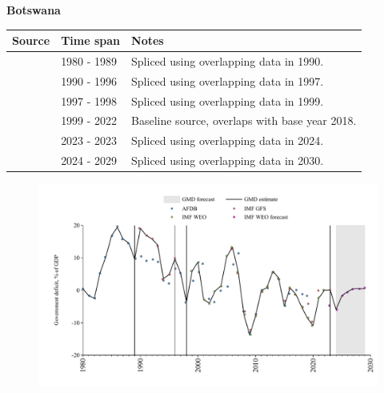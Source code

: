 \documentclass[12pt,a4paper,landscape]{article}
\begin{document}
\begin{adjustbox}{max totalsize={\paperwidth}{\paperheight},center}
\begin{minipage}[t][\textheight][t]{\textwidth}
\vspace*{0.5cm}
{}
\begin{center}
{\Large\bfseries Botswana}
\end{center}
\vspace{0.5cm}
\begin{table}[H]
\centering
\small
\begin{tabular}{|l|l|l|}
\hline
\textbf{Source} & \textbf{Time span} & \textbf{Notes} \\
\hline
\rowcolor{white}\cite{AFDB}& 1980 - 1989 &Spliced using overlapping data in 1990.\\
\rowcolor{lightgray}\cite{IMF_GFS}& 1990 - 1996 &Spliced using overlapping data in 1997.\\
\rowcolor{white}\cite{AFDB}& 1997 - 1998 &Spliced using overlapping data in 1999.\\
\rowcolor{lightgray}\cite{IMF_WEO}& 1999 - 2022 &Baseline source, overlaps with base year 2018.\\
\rowcolor{white}\cite{IMF_GFS}& 2023 - 2023 &Spliced using overlapping data in 2024.\\
\rowcolor{lightgray}\cite{IMF_WEO_forecast}& 2024 - 2029 &Spliced using overlapping data in 2030.\\
\hline
\end{tabular}
\end{table}
\begin{figure}[H]
\centering
\includegraphics[width=\textwidth,height=0.6\textheight,keepaspectratio]{graphs/BWA_govdef_GDP.pdf}
\end{figure}
\end{minipage}
\end{adjustbox}
\end{document}
